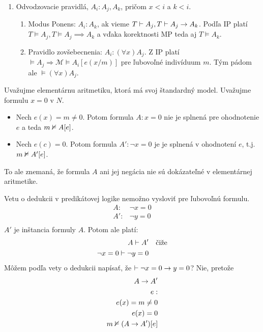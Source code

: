 \begin{dokaz}
\begin{enumerate}
    \item Odvodzovacie pravidlá, $A_i: A_j, A_k$, pričom $x < i$ a
        $k < i$.
        \begin{enumerate}
        \item Modus Ponens:
            $A_i: A_k$, ak vieme
            $T \vdash A_j, T \vdash A_j \rightarrow A_k$.
            Podľa IP platí
            $T \models A_j, T \models A_j \implies A_k$ a vďaka
            korektnosti MP teda aj $T \models A_k$.

        \item Pravidlo zovšebecnenia: $A_i: (\forall x) A_j$.
            Z IP platí $\models A_j \Rightarrow 
                \mathcal{M} \models A_i[e(x/m)]$
            pre ľubovoľné indivíduum $m$. Tým pádom ale
            $\models (\forall x) A_j$.
            
        \end{enumerate}
    \end{enumerate}
\end{dokaz}

\begin{priklad} %
    Uvažujme elementárnu aritmetiku, ktorá má svoj štandardný
    model. Uvažujme formulu $x=0$ v $N$.
    \begin{itemize}
        \item Nech $e(x) = m \neq 0$. Potom formula $A: x=0$ nie je
        splnená pre ohodnotenie $e$ a teda $m \nvDash A[e]$.
        \item Nech $e(c) = 0$. Potom formula $A': \neg x=0$ je je
        splnená v ohodnotení $e$, t.j. $m \nvDash A'[e]$.
    \end{itemize}
    To ale znemaná, že formula $A$ ani jej negácia
    nie sú dokázateľné v elementárnej aritmetike.
\end{priklad}


\begin{poznamka} %
    Vetu o dedukcii v predikátovej logike nemožno vysloviť pre
    ľubovoľnú formulu.
    \begin{align*}
            A: & \neg x=0 \\
            A': & \neg y=0 \\
    \end{align*}
    $A'$ je inštancia formuly $A$. Potom ale platí:
    \begin{align*}
            A \vdash A' & \quad \mbox{čiže}\\
            \neg x=0 \vdash \neg y=0
    \end{align*}
    Môžem podľa vety o dedukcii napísať, že 
    $\vdash \neg x=0 \rightarrow y=0$? Nie, pretože
    \begin{align*}
        A \rightarrow A' \\
        e: \\
        e(x)= m \neq 0 \\
        e(x)= 0 \\
        m \nvDash (A \rightarrow A')[e]
    \end{align*}
\end{poznamka}

